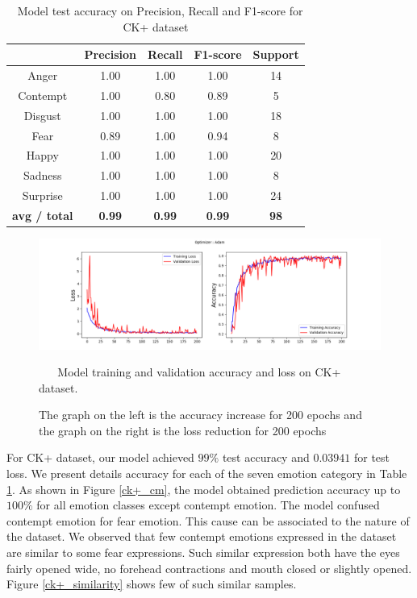 \documentclass[master]{thesis-uestc}
\begin{document}
\begin{table}[ht]
\renewcommand{\arraystretch}{1.3}
\caption{\,\,\,\,\,Model test accuracy on Precision, Recall and F1-score for CK+ dataset}
\label{table_ck+_scores}
\begin{center}
\begin{tabular}{|c|c|c|c|c|}

\hline
 & Precision & Recall & F1-score & Support\\ \hline

Anger & 1.00 & 1.00 & 1.00 & 14\\ \hline
Contempt & 1.00 & 0.80 & 0.89 & 5\\ \hline
Disgust & 1.00 & 1.00 & 1.00 & 18\\ \hline
Fear & 0.89 & 1.00 & 0.94 & 8\\ \hline
Happy & 1.00 & 1.00 & 1.00 & 20\\ \hline
Sadness & 1.00 & 1.00 & 1.00 & 8\\ \hline
Surprise & 1.00 & 1.00 & 1.00 & 24\\ \hline

\textbf{avg / total} & \textbf{0.99} & \textbf{0.99} & \textbf{0.99} & \textbf{98}\\ \hline
\end{tabular}
\end{center}
\end{table}

\begin{figure}[ht]
\includegraphics[width=6.5in]{pic/XK+_accuracy_and_loss.png}
\caption{\,\,\,\,\,\,\,\,\,\,Model training and validation accuracy and loss on CK+ dataset.}
\caption*{The graph on the left is the accuracy increase for 200 epochs and the graph on the right is the loss reduction for 200 epochs}
\label{ck+accuracy_loss}
\end{figure}

For CK+ dataset, our model achieved $99\%$ test accuracy and $0.03941$ for test loss. We present details accuracy for each of the seven emotion category in Table \ref{table_ck+_scores}. As shown in Figure \ref{ck+_cm}, the model obtained prediction accuracy up to $100\%$ for all emotion classes except contempt emotion. The model confused contempt emotion for fear emotion. This cause can be associated to the nature of the dataset. We observed that few contempt emotions expressed in the dataset are similar to some fear expressions. Such similar expression both have the eyes fairly opened wide, no forehead contractions and mouth closed or slightly opened. Figure \ref{ck+_similarity} shows few of such similar samples.
\end{document}
